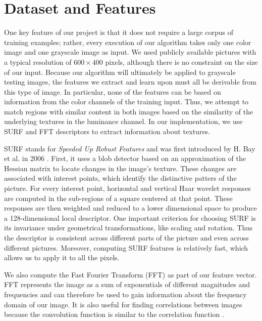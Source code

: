 \section{Dataset and Features}
\label{sec:dataset}

One key feature of our project is that it does not require a large corpus of training examples; rather, every execution of our algorithm takes only one color image and one grayscale image as input. We used publicly available pictures with a typical resolution of $600\times400$ pixels, although there is no constraint on the size of our input.  Because our algorithm will ultimately be applied to grayscale testing images, the features we extract and learn upon must all be derivable from this type of image.  In particular, none of the features can be based on information from the color channels of the training input. Thus, we attempt to match regions with similar content in both images based on the similarity of the underlying textures in the luminance channel. In our implementation, we use SURF and FFT descriptors to extract information about textures. 

SURF stands for \emph{Speeded Up Robust Features} and was first introduced by H. Bay et al. in 2006 \cite{bay2008speeded}. First, it uses a blob detector based on an approximation of the Hessian matrix to locate changes in the image's texture. These changes are associated with interest points, which identify the distinctive patters of the picture. For every interest point, horizontal and vertical Haar wavelet responses are computed in the sub-regions of a square centered at that point. These responses are then weighted and reduced to a lower dimensional space to produce a 128-dimensional local descriptor. One important criterion for choosing SURF is its invariance under geometrical transformations, like scaling and rotation. Thus the descriptor is consistent across different parts of the picture and even across different pictures. Moreover, computing SURF features is relatively fast, which allows us to apply it to all the pixels.

We also compute the Fast Fourier Transform (FFT) as part of our feature vector. FFT represents the image as a sum of exponentials of different magnitudes and frequencies and can therefore be used to gain information about the frequency domain of our image. It is also useful for finding correlations between images because the convolution function is similar to the correlation function \cite{gonzalez2002woods}. 

